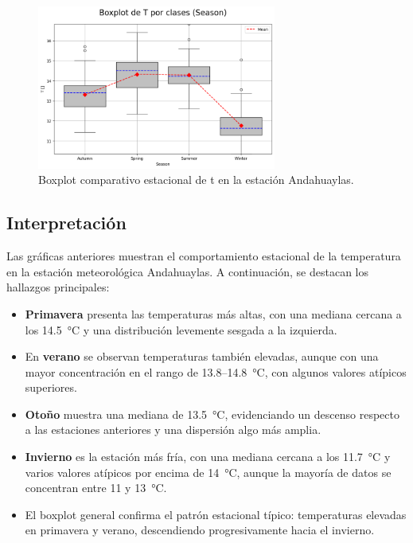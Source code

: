 \vspace{0.2cm}

\begin{figure}[htbp]
\centering
\includegraphics[width=0.7\textwidth]{resultados/por_estacion_del_anio/boxplot_clases_por_estacion/Andahuaylas/T_ClassBoxplot_Season.png}
\caption{Boxplot comparativo estacional de \gls{t}  en la estación Andahuaylas.}
\label{fig:andahuaylas_t_box}
\end{figure}

\subsection*{Interpretación}

Las gráficas anteriores muestran el comportamiento estacional de la temperatura en la estación meteorológica Andahuaylas. A continuación, se destacan los hallazgos principales:

\begin{itemize}
    \item \textbf{Primavera} presenta las temperaturas más altas, con una mediana cercana a los 14.5~°C y una distribución levemente sesgada a la izquierda.
    \item En \textbf{verano} se observan temperaturas también elevadas, aunque con una mayor concentración en el rango de 13.8–14.8~°C, con algunos valores atípicos superiores.
    \item \textbf{Otoño} muestra una mediana de 13.5~°C, evidenciando un descenso respecto a las estaciones anteriores y una dispersión algo más amplia.
    \item \textbf{Invierno} es la estación más fría, con una mediana cercana a los 11.7~°C y varios valores atípicos por encima de 14~°C, aunque la mayoría de datos se concentran entre 11 y 13~°C.
    \item El boxplot general confirma el patrón estacional típico: temperaturas elevadas en primavera y verano, descendiendo progresivamente hacia el invierno.
\end{itemize}



